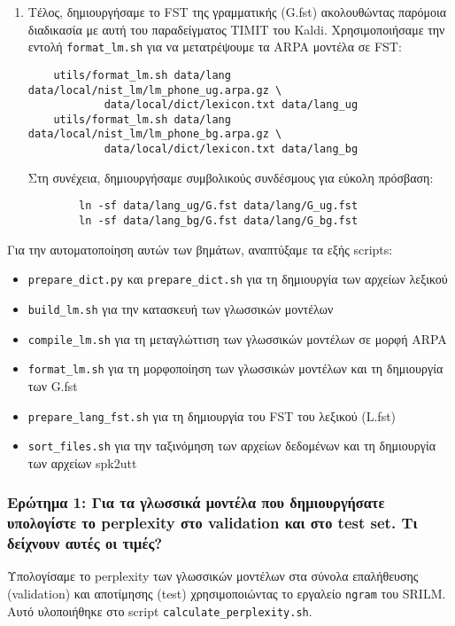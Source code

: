 \documentclass[a4paper,12pt]{article}
\begin{document}
\begin{enumerate}
    
    \item Τέλος, δημιουργήσαμε το FST της γραμματικής (G.fst) ακολουθώντας παρόμοια διαδικασία με αυτή του παραδείγματος TIMIT του Kaldi. Χρησιμοποιήσαμε την εντολή \verb|format_lm.sh| για να μετατρέψουμε τα ARPA μοντέλα σε FST:
    \begin{lstlisting}
    utils/format_lm.sh data/lang data/local/nist_lm/lm_phone_ug.arpa.gz \
            data/local/dict/lexicon.txt data/lang_ug
    utils/format_lm.sh data/lang data/local/nist_lm/lm_phone_bg.arpa.gz \
            data/local/dict/lexicon.txt data/lang_bg
    \end{lstlisting}
    Στη συνέχεια, δημιουργήσαμε συμβολικούς συνδέσμους για εύκολη πρόσβαση:
    \begin{lstlisting}
        ln -sf data/lang_ug/G.fst data/lang/G_ug.fst
        ln -sf data/lang_bg/G.fst data/lang/G_bg.fst
    \end{lstlisting}
\end{enumerate}

Για την αυτοματοποίηση αυτών των βημάτων, αναπτύξαμε τα εξής scripts:
\begin{itemize}
    \item \verb|prepare_dict.py| και \verb|prepare_dict.sh| για τη δημιουργία των αρχείων λεξικού
    \item \verb|build_lm.sh| για την κατασκευή των γλωσσικών μοντέλων
    \item \verb|compile_lm.sh| για τη μεταγλώττιση των γλωσσικών μοντέλων σε μορφή ARPA
    \item \verb|format_lm.sh| για τη μορφοποίηση των γλωσσικών μοντέλων και τη δημιουργία των G.fst
    \item \verb|prepare_lang_fst.sh| για τη δημιουργία του FST του λεξικού (L.fst)
    \item \verb|sort_files.sh| για την ταξινόμηση των αρχείων δεδομένων και τη δημιουργία των αρχείων spk2utt
\end{itemize}

\subsubsection*{Ερώτημα 1: Για τα γλωσσικά μοντέλα που δημιουργήσατε υπολογίστε το perplexity στο validation και στο test set. Τι δείχνουν αυτές οι τιμές?}

Υπολογίσαμε το perplexity των γλωσσικών μοντέλων στα σύνολα επαλήθευσης (validation) και αποτίμησης (test) χρησιμοποιώντας το εργαλείο \verb|ngram| του SRILM. Αυτό υλοποιήθηκε στο script \verb|calculate_perplexity.sh|.
\end{document}
